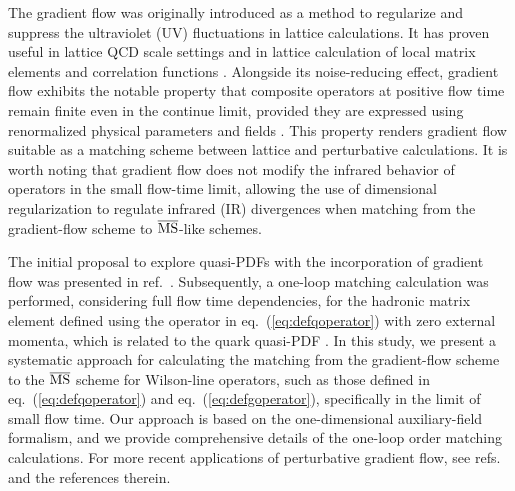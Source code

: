 The gradient flow was originally introduced as  a method to regularize and suppress the ultraviolet (UV) fluctuations \cite{Narayanan:2006rf,Luscher:2009eq} in lattice calculations. It has proven useful in lattice QCD scale settings and in lattice calculation of local matrix elements and correlation functions \cite{Luscher:2010iy,Luscher:2011bx,Luscher:2013cpa,Luscher:2013vga,Borsanyi:2012zs,Sommer:2014mea,Suzuki:2013gza,Makino:2014taa,Harlander:2018zpi,FlavourLatticeAveragingGroupFLAG:2021npn,Leino:2021vop,Mayer-Steudte:2022uih,Leino:2022kgj}. Alongside its noise-reducing effect, gradient flow exhibits the notable property that composite operators at positive flow time remain finite even in the continue limit,  provided they are expressed using renormalized physical parameters and fields \cite{Luscher:2011bx}. This property renders gradient flow suitable as a matching scheme between lattice and perturbative calculations. It is worth noting that gradient flow does not modify the infrared behavior of operators in the small flow-time limit, allowing the use of dimensional regularization to regulate infrared (IR) divergences when matching from the gradient-flow scheme to $\overline{\rm MS}$-like schemes.

The initial proposal to explore quasi-PDFs with the incorporation of gradient flow was presented in ref.~\cite{Monahan:2016bvm}. Subsequently, a one-loop matching calculation was performed, considering full flow time dependencies, for the hadronic matrix element defined using the operator in eq.~(\ref{eq:defqoperator}) with zero external momenta, which is related to the quark quasi-PDF \cite{Monahan:2017hpu}. In this study, we present a systematic approach for calculating the matching from the gradient-flow scheme to the $\overline{\rm MS}$ scheme for Wilson-line operators, such as those defined in eq.~(\ref{eq:defqoperator}) and eq.~(\ref{eq:defgoperator}), specifically in the limit of small flow time. Our approach is based on the one-dimensional auxiliary-field formalism, and we provide comprehensive details of the one-loop order matching calculations.
For more recent applications of perturbative gradient flow, see refs.~\cite{Artz:2019bpr,Rizik:2020naq,Suzuki:2020zue,Harlander:2020duo,Boers:2020uqr,Shindler:2021bcx,Harlander:2022tgk,Mereghetti:2021nkt,Harlander:2022vgf,Brambilla:2021egm,Crosas:2023anw} and the references therein. 


